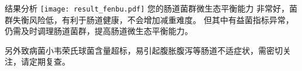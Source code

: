 \vspace*{0mm}

\begin{spacing}{1.5}

\begin{LRaside}[.8]{\fontsize{8.8pt}{11pt}\selectfont 结果分析}
\noindent
\texttt{[image: result\_fenbu.pdf]}
\asidebreak %
\fontsize{8pt}{11pt}\selectfont
您的肠道菌群微生态平衡能力
非常好，菌群失衡风险低，有利于肠道健康，不会增加减重难度。
但其中有益菌指标异常，仍需及时调理肠道菌群，提高肠道微生态平衡能力。

\noindent 另外致病菌小韦荣氏球菌含量超标，易引起腹胀腹泻等肠道不适症状，需密切关注，请定期复查。

\end{LRaside}

\end{spacing}



